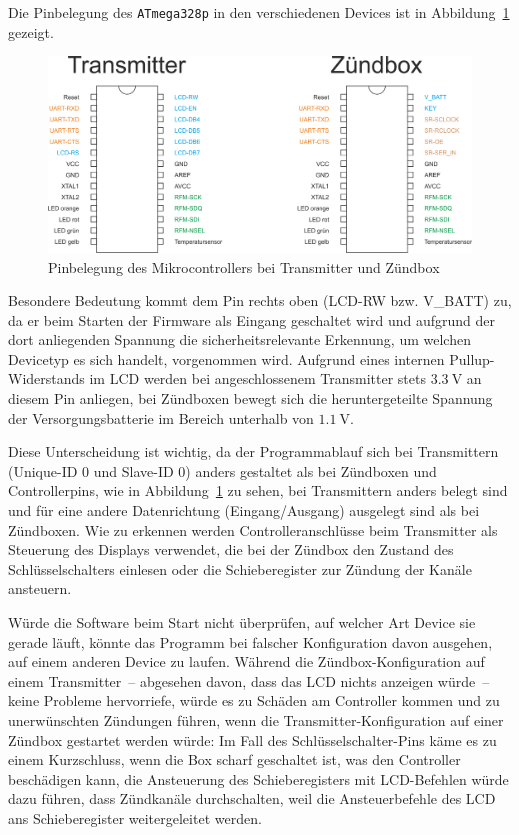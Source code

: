\documentclass[paper=a4, parskip, numbers=noenddot, toc=listof, headsepline]{scrbook}
\begin{document}
		Die Pinbelegung des \texttt{ATmega328p} in den verschiedenen Devices ist in Abbildung~\ref{fig:pinout} gezeigt.

		\begin{figure}
			\centering
			\includegraphics[width=.7\textwidth]{Bilder/pinout}
			\caption{Pinbelegung des Mikrocontrollers bei Transmitter und Zündbox}
			\label{fig:pinout}
		\end{figure}

		Besondere Bedeutung kommt dem Pin rechts oben (LCD-RW bzw. V\_BATT) zu, da er beim Starten der Firmware als Eingang geschaltet wird und aufgrund der dort anliegenden Spannung die sicherheitsrelevante Erkennung, um welchen Devicetyp es sich handelt, vorgenommen wird. Aufgrund eines internen Pullup-Widerstands im LCD werden bei angeschlossenem Transmitter stets $\SI{3,3}{\volt}$ an diesem Pin anliegen, bei Zündboxen bewegt sich die heruntergeteilte Spannung der Versorgungsbatterie im Bereich unterhalb von $\SI{1,1}{\volt}$.

		Diese Unterscheidung ist wichtig, da der Programmablauf sich bei Transmittern (Unique-ID 0 und Slave-ID 0) anders gestaltet als bei Zündboxen und Controllerpins, wie in Abbildung~\ref{fig:pinout} zu sehen, bei Transmittern anders belegt sind und für eine andere Datenrichtung (Eingang/Ausgang) ausgelegt sind als bei Zündboxen.  Wie zu erkennen werden Controlleranschlüsse beim Transmitter als Steuerung des Displays verwendet, die bei der Zündbox den Zustand des Schlüsselschalters einlesen oder die Schieberegister zur Zündung der Kanäle ansteuern.

		Würde die Software beim Start nicht überprüfen, auf welcher Art Device sie gerade läuft, könnte das Programm bei falscher Konfiguration davon ausgehen, auf einem anderen Device zu laufen. Während die Zündbox-Konfiguration auf einem Transmitter~-- abgesehen davon, dass das LCD nichts anzeigen würde~-- keine Probleme hervorriefe, würde es zu Schäden am Controller kommen und zu unerwünschten Zündungen führen, wenn die Transmitter-Konfiguration auf einer Zündbox gestartet werden würde: Im Fall des Schlüsselschalter-Pins käme es  zu einem Kurzschluss, wenn die Box scharf geschaltet ist, was den Controller beschädigen kann, die Ansteuerung des Schieberegisters mit LCD-Befehlen würde dazu führen, dass Zündkanäle durchschalten, weil die Ansteuerbefehle des LCD ans Schieberegister weitergeleitet werden.
\end{document}
